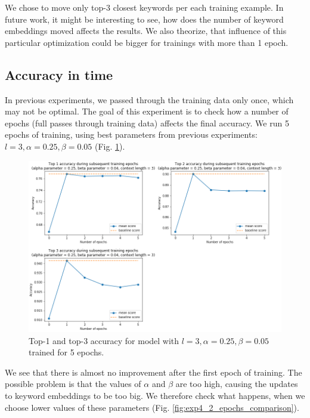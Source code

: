 \documentclass{llncs}
\begin{document}
We chose to move only top-3 closest keywords per each training example. In future work, it might be interesting to see, how does the number of keyword embeddings moved affects the results. We also theorize, that influence of this particular optimization could be bigger for trainings with more than 1 epoch.

\subsection{Accuracy in time}
\label{sec:exp_epochs}
In previous experiments, we passed through the training data only once, which may not be optimal.
The goal of this experiment is to check how a number of epochs (full passes through training data) affects the final accuracy.
We run 5 epochs of training, using best parameters from previous experiments: \(l=3, \alpha=0.25, \beta=0.05\) (Fig. \ref{fig:exp4_1_epochs_fixed}).

\begin{figure}
    \centering
    \caption{Top-1 and top-3 accuracy for model with \(l=3, \alpha=0.25, \beta=0.05\) trained for 5 epochs.}
    \label{fig:exp4_1_epochs_fixed}
    \includegraphics[scale=0.65]{res/exp4_epoch_top_acc.png}
\end{figure}

We see that there is almost no improvement after the first epoch of training.
The possible problem is that the values of \(\alpha\) and \(\beta\) are too high, causing the updates to keyword embeddings to be too big.
We therefore check what happens, when we choose lower values of these parameters (Fig. \ref{fig:exp4_2_epochs_comparison}).
\end{document}
